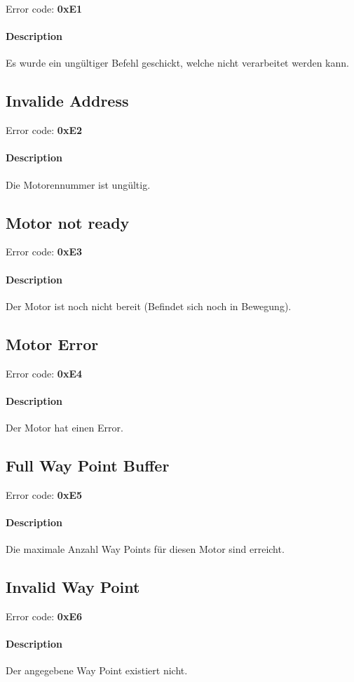 \documentclass[10pt,a4paper]{article}
\begin{document}
Error code: \textbf{0xE1}
\paragraph*{Description\\}
Es wurde ein ungültiger Befehl geschickt, welche nicht verarbeitet werden kann.

\subsection{Invalide Address}

Error code: \textbf{0xE2}
\paragraph*{Description\\}
Die Motorennummer ist ungültig.

\subsection{Motor not ready}

Error code: \textbf{0xE3}
\paragraph*{Description\\}
Der Motor ist noch nicht bereit (Befindet sich noch in Bewegung).

\subsection{Motor Error}

Error code: \textbf{0xE4}
\paragraph*{Description\\}
Der Motor hat einen Error.

\subsection{Full Way Point Buffer}

Error code: \textbf{0xE5}
\paragraph*{Description\\}
Die maximale Anzahl Way Points für diesen Motor sind erreicht.

\subsection{Invalid Way Point}

Error code: \textbf{0xE6}
\paragraph*{Description\\}
Der angegebene Way Point existiert nicht.
\end{document}
